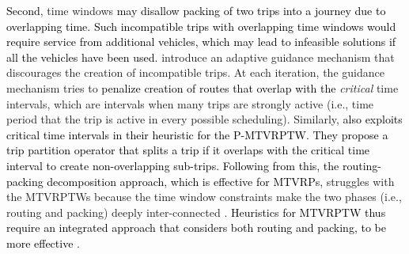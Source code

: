 \documentclass[11pt]{article}
\newcommand\add[1]{\textcolor{black}{#1}}
\begin{document}
\add{Second}, time windows \add{may disallow packing of two trips into a journey due to overlapping time.  Such incompatible trips with overlapping time windows would require service from additional vehicles, which may lead to infeasible solutions if all the vehicles have been used.}  %
\cite{battarra2009adaptive} introduce an adaptive guidance mechanism that discourages the creation of incompatible trips.  At each iteration, the guidance mechanism tries to \add{penalize creation of routes that overlap with the} \textit{critical} time intervals, which are intervals when many trips are strongly active (i.e., time period that the trip is active in every possible scheduling).  %
Similarly, \cite{wang2014metaheuristic} \add{also exploits critical time intervals in their heuristic for the P-MTVRPTW.  They propose a trip partition operator %
that splits a trip if it overlaps with the critical time interval to create non-overlapping sub-trips.}  %
\add{Following from this, the routing-packing decomposition approach, which is effective for MTVRPs,}
struggles with the MTVRPTWs because the time window constraints make the two phases (i.e., routing and packing) deeply inter-connected \citep{cattaruzza2016vehicle}.  \add{Heuristics for MTVRPTW thus require an integrated approach that considers both routing and packing, to be more effective %
\citep[e.g.,][]{franccois2019adaptive}}.
\newline

\end{document}
